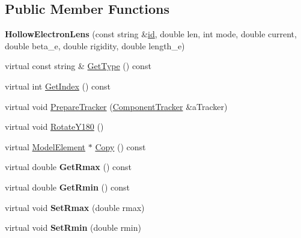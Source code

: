 \subsection*{Public Member Functions}
\begin{DoxyCompactItemize}
\item 
\mbox{\label{classHollowElectronLens_a3d2a72ad73c6837bd2e2954333efdc30}} 
{\bfseries Hollow\+Electron\+Lens} (const string \&\hyperlink{classModelElement_aada171ead2085c75b592cf07d91bc5c2}{id}, double len, int mode, double current, double beta\+\_\+e, double rigidity, double length\+\_\+e)
\item 
virtual const string \& \hyperlink{classHollowElectronLens_add07b8f08bad11edfb3df87be488e9ff}{Get\+Type} () const
\item 
virtual int \hyperlink{classHollowElectronLens_a87c06909a695e81cb1abc546019e4e40}{Get\+Index} () const
\item 
virtual void \hyperlink{classHollowElectronLens_a86e8e69936f636a5d3fa0675e0434bf4}{Prepare\+Tracker} (\hyperlink{classComponentTracker}{Component\+Tracker} \&a\+Tracker)
\item 
virtual void \hyperlink{classHollowElectronLens_a8e806750ac6f8129d3be4a089303da36}{Rotate\+Y180} ()
\item 
virtual \hyperlink{classModelElement}{Model\+Element} $\ast$ \hyperlink{classHollowElectronLens_a95d48cbadab7dcc58a1d4c1d9895e8d3}{Copy} () const
\item 
\mbox{\label{classHollowElectronLens_a9f3f6149b14cb77eae31ed570648c84b}} 
virtual double {\bfseries Get\+Rmax} () const
\item 
\mbox{\label{classHollowElectronLens_a70ccff641171a4dd78875a73ae7a3dea}} 
virtual double {\bfseries Get\+Rmin} () const
\item 
\mbox{\label{classHollowElectronLens_a1270cb88c6606bc8df0695a447d8e921}} 
virtual void {\bfseries Set\+Rmax} (double rmax)
\item 
\mbox{\label{classHollowElectronLens_ae1b2fa9b7c31ce28898137292ad8a353}} 
virtual void {\bfseries Set\+Rmin} (double rmin)
\item 
\mbox{\label{classHollowElectronLens_a1af226184c45586f024528db9a2855a6}} 

\end{DoxyCompactItemize}
